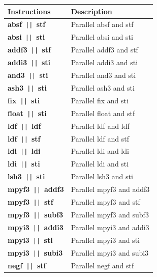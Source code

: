 \begin{table}[!p]
\begin{center}
	\small
	\begin{tabular}{|p{3.0cm}|p{10.0cm}|}
	\hline
	\textbf{Instructions} & \textbf{Description}\\
	\hline
	\textbf{absf}\texttt{~||~}\textbf{stf} & Parallel absf and stf\\
	\hline
	\textbf{absi}\texttt{~||~}\textbf{sti} & Parallel absi and sti\\
	\hline
	\textbf{addf3}\texttt{~||~}\textbf{stf} & Parallel addf3 and stf\\
	\hline
	\textbf{addi3}\texttt{~||~}\textbf{sti} & Parallel addi3 and sti\\
	\hline
	\textbf{and3}\texttt{~||~}\textbf{sti} & Parallel and3 and sti\\
	\hline
	\textbf{ash3}\texttt{~||~}\textbf{sti} & Parallel ash3 and sti\\
	\hline
	\textbf{fix}\texttt{~||~}\textbf{sti} & Parallel fix and sti\\
	\hline
	\textbf{float}\texttt{~||~}\textbf{sti} & Parallel float and stf\\
	\hline
	\textbf{ldf}\texttt{~||~}\textbf{ldf} & Parallel ldf and ldf\\
	\hline
	\textbf{ldf}\texttt{~||~}\textbf{stf} & Parallel ldf and stf\\
	\hline
	\textbf{ldi}\texttt{~||~}\textbf{ldi} & Parallel ldi and ldi\\
	\hline
	\textbf{ldi}\texttt{~||~}\textbf{sti} & Parallel ldi and sti\\
	\hline
	\textbf{lsh3}\texttt{~||~}\textbf{sti} & Parallel lsh3 and sti\\
	\hline
	\textbf{mpyf3}\texttt{~||~}\textbf{addf3} & Parallel mpyf3 and addf3\\
	\hline
	\textbf{mpyf3}\texttt{~||~}\textbf{stf} & Parallel mpyf3 and stf\\
	\hline
	\textbf{mpyf3}\texttt{~||~}\textbf{subf3} & Parallel mpyf3 and subf3\\
	\hline
	\textbf{mpyi3}\texttt{~||~}\textbf{addi3} & Parallel mpyi3 and addi3\\
	\hline
	\textbf{mpyi3}\texttt{~||~}\textbf{sti} & Parallel mpyi3 and sti\\
	\hline
	\textbf{mpyi3}\texttt{~||~}\textbf{subi3} & Parallel mpyi3 and subi3\\
	\hline
	\textbf{negf}\texttt{~||~}\textbf{stf} & Parallel negf and stf\\

\end{tabular}
\end{center}
\end{table}

